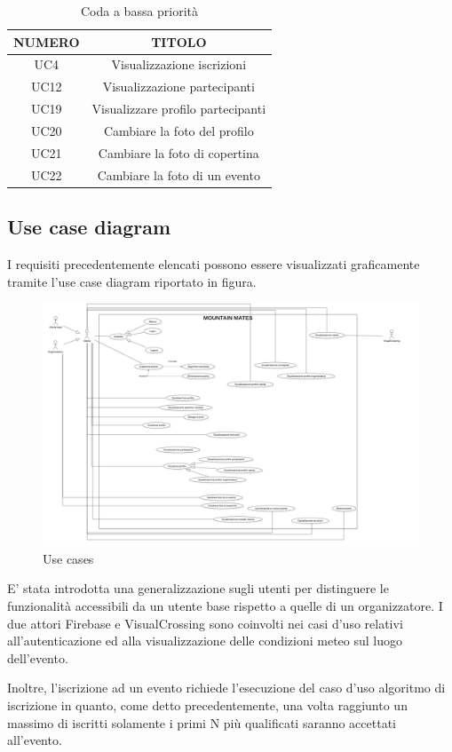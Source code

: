 \begin{table}
\begin{center}
\begin{tabular}{ |c|c|}
 \hline
 \textbf{NUMERO}& \textbf{TITOLO} \\ \hline
 UC4& Visualizzazione iscrizioni\\ \hline
 UC12& Visualizzazione partecipanti\\ \hline
 UC19& Visualizzare profilo partecipanti\\ \hline
 UC20& Cambiare la foto del profilo\\ \hline
 UC21& Cambiare la foto di copertina\\ \hline
 UC22& Cambiare la foto di un evento\\ \hline
\end{tabular}
  \caption{Coda a bassa priorità}
  \label{tab: bassa-priorità}
\end{center}
\end{table}

\clearpage
\subsection{Use case diagram}
I requisiti precedentemente elencati possono essere visualizzati graficamente tramite l'use case diagram riportato in figura.

\begin{figure}[ht!]
    \centering
    \includegraphics[scale=0.55]{Iterazione 0/immagini/UseCases.png}
    \caption{Use cases}
    \label{fig: usecases}
  \end{figure}

E' stata introdotta una generalizzazione sugli utenti per distinguere le funzionalità accessibili da un utente base
rispetto a quelle di un organizzatore.
I due attori Firebase e VisualCrossing sono coinvolti nei casi d'uso relativi all'autenticazione ed alla visualizzazione delle
condizioni meteo sul luogo dell'evento.

Inoltre, l'iscrizione ad un evento richiede l'esecuzione del caso d'uso algoritmo di iscrizione in quanto, come detto precedentemente,
una volta raggiunto un massimo di iscritti solamente i primi N più qualificati saranno accettati all'evento.